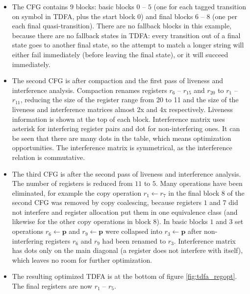\documentclass[]{article}
\begin{document}
\begin{itemize}

\item[\ding{212}]
The CFG contains $9$ blocks: basic blocks $0$ -- $5$ (one for each tagged transition on symbol in TDFA, plus the start block $0$)
and final blocks $6$ -- $8$ (one per each final quasi-transition).
There are no fallback blocks in this example, because there are no fallback states in TDFA:
every transition out of a final state goes to another final state,
so the attempt to match a longer string will either fail immediately (before leaving the final state),
or it will succeed immediately.
\medskip

\item[\ding{212}]
The second CFG is after compaction and the first pass of liveness and interference analysis.
Compaction renames registers $r_6$ -- $r_{15}$ and $r_{20}$ to $r_1$ -- $r_{11}$,
reducing the size of the register range from 20 to 11 and the size of the liveness and interference matrices almost 2x and 4x respectively.
Liveness information is shown at the top of each block.
Interference matrix uses asterisk for interfering register pairs and dot for non-interfering ones.
It can be seen that there are many dots in the table, which means optimization opportunities.
The interference matrix is symmetrical, as the interference relation is commutative.
\medskip

\item[\ding{212}]
The third CFG is after the second pass of liveness and interference analysis.
The number of registers is reduced from $11$ to $5$.
Many operations have been eliminated, for example the copy operation $r_1 \leftarrow r_7$ in the final block $8$ of the second CFG
was removed by copy coalescing, because registers $1$ and $7$ did not interfere and register allocation put them in one equivalence class
(and likewise for the other copy operations in block $8$).
In basic blocks $1$ and $3$ set operations $r_6 \leftarrow \mathbf{p}$ and $r_9 \leftarrow \mathbf{p}$ were collapsed into $r_3 \leftarrow \mathbf{p}$
after non-interfering registers $r_6$ and $r_9$ had been renamed to $r_3$.
Interference matrix has dots only on the main diagonal (a register does not interfere with itself),
which leaves no room for further optimization.
\medskip

\item[\ding{212}]
The resulting optimized TDFA is at the bottom of figure \ref{fig:tdfa_regopt}.
The final registers are now $r_1$ -- $r_5$.
\medskip

\end{itemize}
\end{document}
